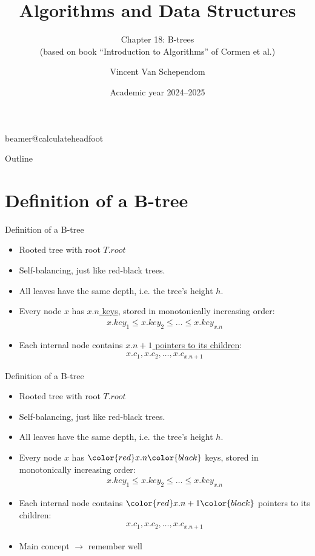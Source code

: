 \documentclass[11pt,t]{beamer}
\title[A\&D Chapter 18: B-trees]{Algorithms and Data Structures} %
\subtitle{Chapter 18: B-trees\\(based on book “Introduction to Algorithms” of Cormen et al.)}
\author{Vincent Van Schependom}
\institute{KU Leuven Campus Kulak Kortrijk}
\date{Academic year 2024--2025}
\newcommand{\rood}[1]{\color{red}#1\color{black}}
\begin{document}
	\csname beamer@calculateheadfoot\endcsname %


	\begin{frame}
		\titlepage
	\end{frame}


	\begin{frame}{Outline}
		\hfill	{\large \parbox{.961\textwidth}{\tableofcontents[hideothersubsections]}}
	\end{frame}

	\section{Definition of a B-tree}

	\begin{frame}{Definition of a B-tree}
		\begin{itemize}[<+->]
			\item Rooted tree with root \(T.root\)
			\item Self-balancing, just like red-black trees.
			\item All leaves have the same depth, i.e. the tree's height \(h\).
			\item Every node \(x\) has \underline{\(x.n\) keys}, stored in monotonically increasing order: \begin{align*}
				{x.key_1 \leq x.key_2 \leq \ldots \leq x.key_{x.n}}
			\end{align*}
			\item Each internal node contains \underline{\(x.n+1\) pointers to its children}:
			\begin{align*}
				x.c_1, x.c_2, \ldots, x.c_{x.n+1}
			\end{align*}
		\end{itemize}
	\end{frame}

	\begin{frame}{Definition of a B-tree}
		\begin{itemize}
			\item Rooted tree with root \(T.root\)
			\item Self-balancing, just like red-black trees.
			\item All leaves have the same depth, i.e. the tree's height \(h\).
			\item Every node \(x\) has \(\rood{x.n}\) \rood{keys}, stored in monotonically increasing order: \begin{align*}
				{x.key_1 \leq x.key_2 \leq \ldots \leq x.key_{x.n}}
			\end{align*}
			\item Each internal node contains \(\rood{x.n+1}\) pointers to its \rood{children}:
			\begin{align*}
				x.c_1, x.c_2, \ldots, x.c_{x.n+1}
			\end{align*}
			\item Main concept \(\rightarrow\) remember well
		\end{itemize}
	\end{frame}
\end{document}
